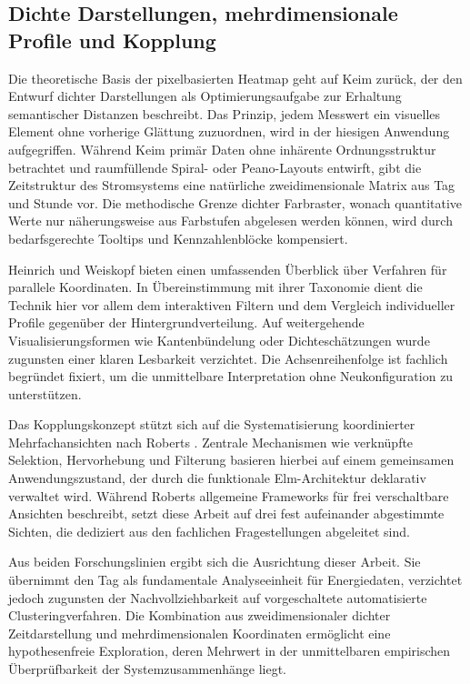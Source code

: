 \subsection*{Dichte Darstellungen, mehrdimensionale Profile und Kopplung}

Die theoretische Basis der pixelbasierten Heatmap geht auf Keim \cite{Keim2000} zurück, der den Entwurf dichter Darstellungen als Optimierungsaufgabe zur Erhaltung semantischer Distanzen beschreibt. Das Prinzip, jedem Messwert ein visuelles Element ohne vorherige Glättung zuzuordnen, wird in der hiesigen Anwendung aufgegriffen. Während Keim primär Daten ohne inhärente Ordnungsstruktur betrachtet und raumfüllende Spiral- oder Peano-Layouts entwirft, gibt die Zeitstruktur des Stromsystems eine natürliche zweidimensionale Matrix aus Tag und Stunde vor. Die methodische Grenze dichter Farbraster, wonach quantitative Werte nur näherungsweise aus Farbstufen abgelesen werden können, wird durch bedarfsgerechte Tooltips und Kennzahlenblöcke kompensiert.

Heinrich und Weiskopf \cite{Heinrich2013} bieten einen umfassenden Überblick über Verfahren für parallele Koordinaten. In Übereinstimmung mit ihrer Taxonomie dient die Technik hier vor allem dem interaktiven Filtern und dem Vergleich individueller Profile gegenüber der Hintergrundverteilung. Auf weitergehende Visualisierungsformen wie Kantenbündelung oder Dichteschätzungen wurde zugunsten einer klaren Lesbarkeit verzichtet. Die Achsenreihenfolge ist fachlich begründet fixiert, um die unmittelbare Interpretation ohne Neukonfiguration zu unterstützen.

Das Kopplungskonzept stützt sich auf die Systematisierung koordinierter Mehrfachansichten nach Roberts \cite{Roberts2007}. Zentrale Mechanismen wie verknüpfte Selektion, Hervorhebung und Filterung basieren hierbei auf einem gemeinsamen Anwendungszustand, der durch die funktionale Elm-Architektur deklarativ verwaltet wird. Während Roberts allgemeine Frameworks für frei verschaltbare Ansichten beschreibt, setzt diese Arbeit auf drei fest aufeinander abgestimmte Sichten, die dediziert aus den fachlichen Fragestellungen abgeleitet sind.

Aus beiden Forschungslinien ergibt sich die Ausrichtung dieser Arbeit. Sie übernimmt den Tag als fundamentale Analyseeinheit für Energiedaten, verzichtet jedoch zugunsten der Nachvollziehbarkeit auf vorgeschaltete automatisierte Clusteringverfahren. Die Kombination aus zweidimensionaler dichter Zeitdarstellung und mehrdimensionalen Koordinaten ermöglicht eine hypothesenfreie Exploration, deren Mehrwert in der unmittelbaren empirischen Überprüfbarkeit der Systemzusammenhänge liegt.
